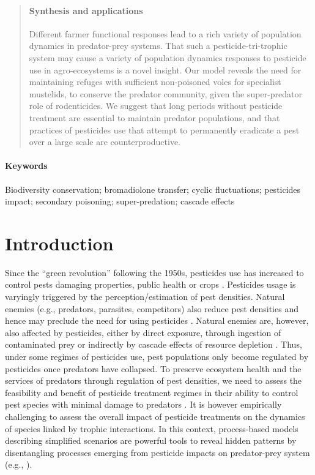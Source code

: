 \documentclass[11pt]{article}
\begin{document}
\begin{abstract}
\paragraph{Synthesis and applications} Different farmer functional responses lead to a rich variety of population dynamics in predator-prey systems. That such a pesticide-tri-trophic system may cause a variety of population dynamics responses to pesticide use in agro-ecosystems is a novel insight. Our model reveals the need for maintaining refuges with sufficient non-poisoned voles for specialist mustelids, to conserve the predator community, given the super-predator role of rodenticides. We suggest that long periods without pesticide treatment are essential to maintain predator populations, and that practices of pesticides use that attempt to permanently eradicate a pest over a large scale are counterproductive. 

\end{abstract}

\paragraph{Keywords} Biodiversity conservation; bromadiolone transfer; cyclic fluctuations; pesticides impact; secondary poisoning; super-predation; cascade effects

\section{Introduction}

Since the “green revolution” following the 1950s, pesticides use has increased to control pests damaging properties, public health or crops \citep{Tilman2002}. Pesticides usage is varyingly triggered by the perception/estimation of pest densities. Natural enemies (e.g., predators, parasites, competitors) also reduce pest densities and hence may preclude the need for using pesticides \citep{Michalko2017}. Natural enemies are, however, also affected by pesticides, either by direct exposure, through ingestion of contaminated prey \citep{Berny2007} or indirectly by cascade effects of resource depletion \citep{Halstead2014}.  Thus, under some regimes of pesticides use, pest populations only become regulated by pesticides once predators have collapsed. To preserve ecosystem health and the services of predators through regulation of pest densities, we need to assess the feasibility and benefit of pesticide treatment regimes in their ability to control pest species with minimal damage to predators \citep{Halstead2014}. It is however empirically challenging to assess the overall impact of pesticide treatments on the dynamics of species linked by trophic interactions. In this context, process-based models describing simplified scenarios are powerful tools to reveal hidden patterns by disentangling processes emerging from pesticide impacts on predator-prey system (e.g., \citet{Baudrot2018}).
\end{document}
